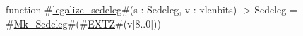 function #\hyperref[sailRISCVzlegalizzezysedeleg]{legalize\_sedeleg}#(s : Sedeleg, v : xlenbits) -> Sedeleg = {
  #\hyperref[sailRISCVzMkzySedeleg]{Mk\_Sedeleg}#(#\hyperref[sailRISCVzEXTZ]{EXTZ}#(v[8..0]))
}

